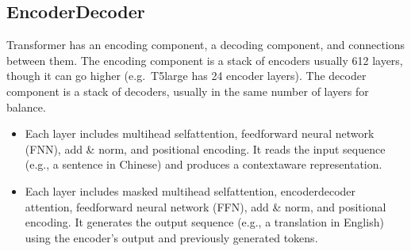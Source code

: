 \documentclass[letterpaper,11pt,english]{sphinxmanual}
\begin{document}
\subsection{Encoder\sphinxhyphen{}Decoder}
\label{\detokenize{pretraining:encoder-decoder}}
\sphinxAtStartPar
Transformer has an encoding component, a decoding component, and
connections between them. The encoding component is a stack of encoders
\sphinxhyphen{} usually 6\sphinxhyphen{}12 layers, though it can go higher (e.g. T5\sphinxhyphen{}large has 24
encoder layers). The decoder component is a stack of decoders, usually
in the same number of layers for balance.
\begin{itemize}
\item {} 
\sphinxAtStartPar
Each  layer includes multi\sphinxhyphen{}head self\sphinxhyphen{}attention, feedforward
neural network (FNN), add \& norm, and positional encoding. It reads
the input sequence (e.g., a sentence in Chinese) and produces a
context\sphinxhyphen{}aware representation.

\item {} 
\sphinxAtStartPar
Each  layer includes masked multi\sphinxhyphen{}head self\sphinxhyphen{}attention,
encoder\sphinxhyphen{}decoder attention, feedforward neural network (FFN), add \&
norm, and positional encoding. It generates the output sequence (e.g.,
a translation in English) using the encoder’s output and previously
generated tokens.

\end{itemize}
\end{document}
